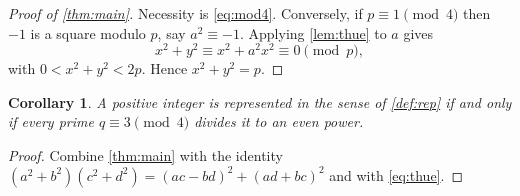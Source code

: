 \documentclass{article}
\newtheorem{corollary}[theorem]{Corollary}
\theoremstyle{definition}
\numberwithin{equation}{section}
\begin{document}
\begin{proof}[Proof of \cref{thm:main}]
Necessity is \eqref{eq:mod4}. Conversely, if $p \equiv 1 \pmod 4$ then
$-1$ is a square modulo $p$, say $a^2 \equiv -1$. Applying
\cref{lem:thue} to $a$ gives
\begin{equation}\label{eq:thue}
  x^2 + y^2 \equiv x^2 + a^2x^2 \equiv 0 \pmod p,
\end{equation}
with $0 < x^2 + y^2 < 2p$. Hence $x^2 + y^2 = p$.
\end{proof}

\begin{corollary}\label{cor:general}
A positive integer is represented in the sense of \cref{def:rep} if and
only if every prime $q \equiv 3 \pmod 4$ divides it to an even power.
\end{corollary}

\begin{proof}
Combine \cref{thm:main} with the identity
$(a^2+b^2)(c^2+d^2) = (ac-bd)^2 + (ad+bc)^2$ and with \eqref{eq:thue}.
\end{proof}
\end{document}
